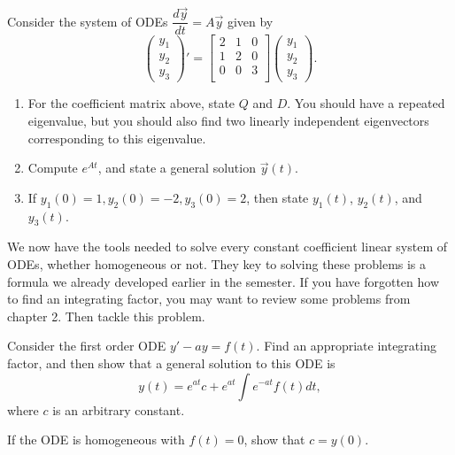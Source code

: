 \begin{problem}
 Consider the system of ODEs $\dfrac{d\vec y}{dt} = A\vec y$ given by  
$$
\begin{pmatrix}
y_1\\
y_2\\ 
y_3
\end{pmatrix}'
=
\begin{bmatrix}
 2&1&0\\
 1&2&0\\
 0&0&3\\
\end{bmatrix}
\begin{pmatrix}
y_1\\
y_2\\ 
y_3
\end{pmatrix}.
$$
\begin{enumerate}
 \item For the coefficient matrix above, state $Q$ and $D$. You should have a repeated eigenvalue, but you should also find two linearly independent eigenvectors corresponding to this eigenvalue. 
 \item 
{}%
Compute $e^{At}$, and state a general solution $\vec y(t)$. 
 \item If $y_1(0)=1, y_2(0)=-2, y_3(0)=2$, then state $y_1(t)$, $y_2(t)$, and $y_3(t)$.  
\end{enumerate}

\end{problem}



We now have the tools needed to solve every constant coefficient linear system of ODEs, whether homogeneous or not. They key to solving these problems is a formula we already developed earlier in the semester. If you have forgotten how to find an integrating factor, you may want to review some problems from chapter 2. Then tackle this problem.

\begin{problem}
 Consider the first order ODE $y'-ay=f(t)$. Find an appropriate integrating factor, and then show that a general solution to this ODE is
 $$y(t) = e^{at}c + e^{at}\int e^{-at}f(t) dt,$$
 where $c$ is an arbitrary constant.  

 If the ODE is homogeneous with $f(t)=0$, show that $c=y(0)$.
\end{problem}

